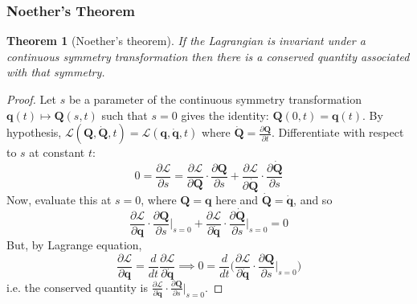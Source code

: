 \documentclass[a4paper]{article}
\theoremstyle{new}
\newtheorem{thm}{Theorem}[section]
\begin{document}
\subsubsection{Noether's Theorem}
\begin{thm}[Noether's theorem]
If the Lagrangian is invariant under a continuous symmetry transformation then there is a conserved quantity associated with that symmetry.
\end{thm}
\begin{proof}
Let $s$ be a parameter of the continuous symmetry transformation $\mathbf{q}(t)\mapsto\mathbf{Q}(s,t)$ such that $s=0$ gives the identity: $\mathbf{Q}(0,t)=\mathbf{q}(t)$. By hypothesis, $\mathcal{L}(\mathbf{Q},\mathbf{\dot{Q}},t)=\mathcal{L}(\mathbf{q},\mathbf{\dot{q}},t)$ where $\mathbf{\dot{Q}}=\frac{\partial\mathbf{Q}}{\partial t}$. Differentiate with respect to $s$ at constant $t$:
$$0=\frac{\partial\mathcal{L}}{\partial s}=\frac{\partial\mathcal{L}}{\partial\mathbf{Q}}\cdot\frac{\partial\mathbf{Q}}{\partial s}+\frac{\partial\mathcal{L}}{\partial\mathbf{\dot{Q}}}\cdot\frac{\partial\mathbf{\dot{Q}}}{\partial s}$$
Now, evaluate this at $s=0$, where $\mathbf{Q}=\mathbf{q}$ here and $\mathbf{\dot{Q}}=\mathbf{\dot{q}}$, and so
$$\frac{\partial\mathcal{L}}{\partial\mathbf{q}}\cdot\frac{\partial\mathbf{Q}}{\partial s}\bigg|_{s=0}+\frac{\partial\mathcal{L}}{\partial\mathbf{\dot{q}}}\cdot\frac{\partial\mathbf{\dot{Q}}}{\partial s}\bigg|_{s=0}=0$$
But, by Lagrange equation,
$$\frac{\partial\mathcal{L}}{\partial\mathbf{q}}=\frac{d}{dt}\frac{\partial\mathcal{L}}{\partial\mathbf{\dot{q}}}\implies0=\frac{d}{dt}\bigg(\frac{\partial\mathcal{L}}{\partial\mathbf{\dot{q}}}\cdot\frac{\partial\mathbf{Q}}{\partial s}\bigg|_{s=0}\bigg)$$
i.e. the conserved quantity is $\frac{\partial\mathcal{L}}{\partial\mathbf{\dot{q}}}\cdot\frac{\partial\mathbf{Q}}{\partial s}|_{s=0}$.
\end{proof}
\end{document}
